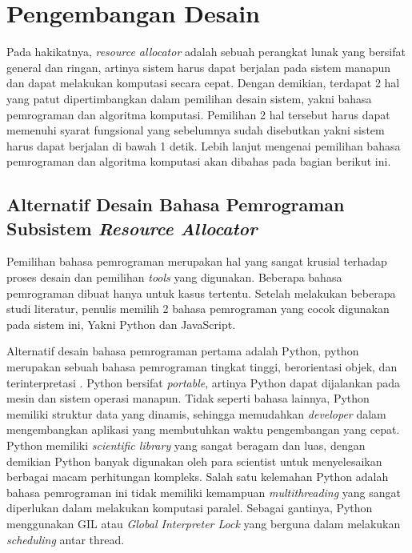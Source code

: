 \section{Pengembangan Desain}
    Pada hakikatnya, \textit{resource allocator} adalah sebuah perangkat lunak yang bersifat general dan ringan, artinya sistem harus dapat berjalan pada sistem manapun
    dan dapat melakukan komputasi secara cepat. Dengan demikian, terdapat 2 hal yang patut dipertimbangkan dalam pemilihan desain sistem, yakni bahasa pemrograman dan algoritma komputasi.
    Pemilihan 2 hal tersebut harus dapat memenuhi syarat fungsional yang sebelumnya sudah disebutkan yakni sistem harus dapat berjalan di bawah 1 detik.
    Lebih lanjut mengenai pemilihan bahasa pemrograman dan algoritma komputasi akan dibahas pada bagian berikut ini.
    \subsection{Alternatif Desain Bahasa Pemrograman Subsistem \textit{Resource Allocator}}
        Pemilihan bahasa pemrograman merupakan hal yang sangat krusial terhadap proses desain dan pemilihan \textit{tools} yang digunakan. 
        Beberapa bahasa pemrograman dibuat hanya untuk kasus tertentu. Setelah melakukan beberapa studi literatur, penulis memilih 2 bahasa pemrograman
        yang cocok digunakan pada sistem ini, Yakni Python dan JavaScript.

        Alternatif desain bahasa pemrograman pertama adalah Python, python merupakan sebuah bahasa pemrograman tingkat tinggi, berorientasi objek, dan
        terinterpretasi \citep{python}. Python bersifat \textit{portable}, artinya Python dapat dijalankan pada mesin dan sistem operasi manapun.
        Tidak seperti bahasa lainnya, Python memiliki struktur data yang dinamis, sehingga memudahkan \textit{developer} dalam mengembangkan aplikasi yang membutuhkan waktu
        pengembangan yang cepat. Python memiliki \textit{scientific library} yang sangat beragam dan luas, dengan demikian Python banyak digunakan oleh para scientist untuk
        menyelesaikan berbagai macam perhitungan kompleks. Salah satu kelemahan Python adalah bahasa pemrograman ini tidak memiliki kemampuan \textit{multithreading} yang sangat diperlukan
        dalam melakukan komputasi paralel. Sebagai gantinya, Python menggunakan GIL atau \textit{Global Interpreter Lock} yang berguna dalam melakukan \textit{scheduling} antar thread.

        

